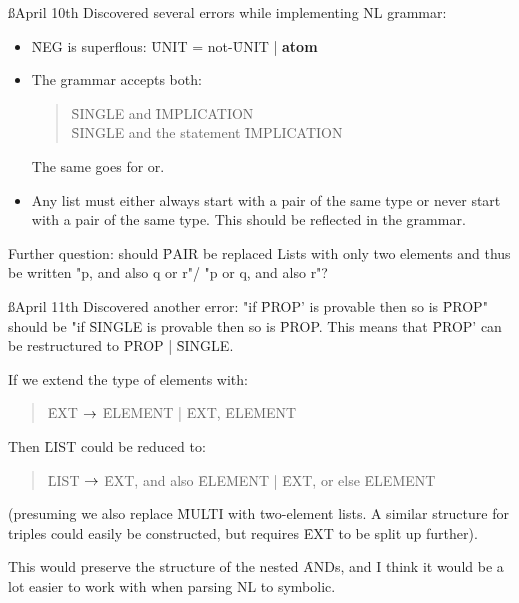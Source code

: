\documentclass[a4paper]{article}
\begin{document}
\ss{April 10th}
Discovered several errors while implementing NL grammar:
\begin{itemize}
    \item \f{NEG} is superflous: \f{UNIT} = not-\f{UNIT} | {\bf atom}
    \item The grammar accepts both:
        \begin{quote}\f{SINGLE} and \f{IMPLICATION}\\
                     \f{SINGLE} and the statement \f{IMPLICATION}
        \end{quote}
        The same goes for or.
    \item Any list must either always start with a pair of the same type or
    never start with a pair of the same type. This should be reflected in 
    the grammar.
\end{itemize}
Further question: should \f{PAIR} be replaced Lists with only two elements
and thus be written "p, and also q or r"/ "p or q, and also r"?

\ss{April 11th}
Discovered another error: "if \f{PROP'} is provable then so is \f{PROP}"
should be "if \f{SINGLE} is provable then so is \f{PROP}. This means that
\f{PROP'} can be restructured to \f{PROP} | \f{SINGLE}.

If we extend the type of elements with:
\begin{quote}
    \f{EXT } $\rightarrow$ \f{ELEMENT} | \f{EXT}, \f{ELEMENT}
\end{quote}
Then \f{LIST} could be reduced to:
\begin{quote}
    \f{LIST} $\rightarrow$ \f{EXT}, and also \f{ELEMENT} 
                 | \f{EXT}, or else  \f{ELEMENT}
\end{quote}
(presuming we also replace \f{MULTI} with two-element lists. A similar
structure for triples could easily be constructed, but requires \f{EXT} to
be split up further).

This would preserve the structure of the nested \f{AND}s, and I think it
would be a lot easier to work with when parsing NL to symbolic.

\label{LastApp}
\label{LastPage}
\end{document}

